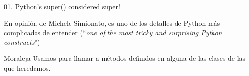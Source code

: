 \begin{frame}{01. Python's super() considered super!}
  \begin{center}
    En opinión de Michele Simionato,  es uno de los
    detalles de Python más complicados de entender (``\textit{one of the
      most tricky and surprising Python constructs}'')
    \end{center}

  \vspace{0.25cm}

  \begin{alertblock}{\centering Moraleja}
    \centering Usamos  para llamar a métodos
    definidos en alguna de las clases de las que heredamos.
  \end{alertblock}
\end{frame}
